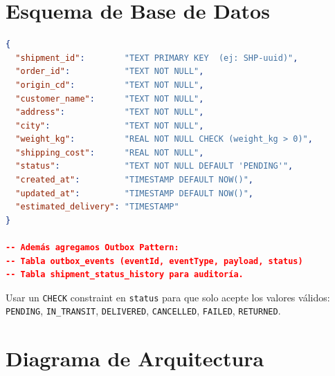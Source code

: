 \documentclass[11pt, a4paper]{article}
\begin{document}
\section{Esquema de Base de Datos}

\begin{lstlisting}[language=json, title={\textbf{Tabla: shipments}}]
{
  "shipment_id":        "TEXT PRIMARY KEY  (ej: SHP-uuid)",
  "order_id":           "TEXT NOT NULL",
  "origin_cd":          "TEXT NOT NULL",
  "customer_name":      "TEXT NOT NULL",
  "address":            "TEXT NOT NULL",
  "city":               "TEXT NOT NULL",
  "weight_kg":          "REAL NOT NULL CHECK (weight_kg > 0)",
  "shipping_cost":      "REAL NOT NULL",
  "status":             "TEXT NOT NULL DEFAULT 'PENDING'",
  "created_at":         "TIMESTAMP DEFAULT NOW()",
  "updated_at":         "TIMESTAMP DEFAULT NOW()",
  "estimated_delivery": "TIMESTAMP"
}

-- Además agregamos Outbox Pattern:
-- Tabla outbox_events (eventId, eventType, payload, status)
-- Tabla shipment_status_history para auditoría.
\end{lstlisting}

\begin{infobox}
  Usar un \texttt{CHECK} constraint en \texttt{status} para que solo acepte
  los valores válidos: \texttt{PENDING}, \texttt{IN\_TRANSIT},
  \texttt{DELIVERED}, \texttt{CANCELLED}, \texttt{FAILED}, \texttt{RETURNED}.
\end{infobox}


\section{Diagrama de Arquitectura}
\end{document}
